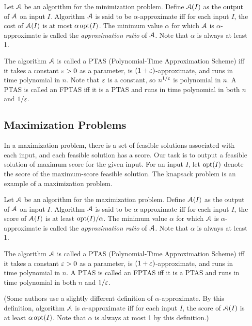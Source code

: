 Let $\mathcal{A}$ be an algorithm for the minimization problem.
Define $\mathcal{A}(I)$ as the output of $\mathcal{A}$ on input $I$.
Algorithm $\mathcal{A}$ is said to be $\alpha$-approximate iff
for each input $I$, the cost of $\mathcal{A}(I)$ is at most $\alpha\operatorname{opt}(I)$.
The minimum value $\alpha$ for which $\mathcal{A}$ is $\alpha$-approximate
is called the \emph{approximation ratio} of $\mathcal{A}$.
Note that $\alpha$ is always at least 1.

The algorithm $\mathcal{A}$ is called a PTAS (Polynomial-Time Approximation Scheme)
iff it takes a constant $\varepsilon > 0$ as a parameter, is $(1+\varepsilon)$-approximate,
and runs in time polynomial in $n$.
Note that $\varepsilon$ is a constant, so $n^{1/\varepsilon}$ is polynomial in $n$.
A PTAS is called an FPTAS iff it is a PTAS and runs in time polynomial
in both $n$ and $1/\varepsilon$.

\subsection{Maximization Problems}
\label{sec:appx:max}

In a maximization problem, there is a set of feasible solutions associated with each input,
and each feasible solution has a score.
Our task is to output a feasible solution of maximum score for the given input.
For an input $I$, let $\operatorname{opt}(I)$ denote the score of the maximum-score feasible solution.
The knapsack problem is an example of a maximization problem.

Let $\mathcal{A}$ be an algorithm for the maximization problem.
Define $\mathcal{A}(I)$ as the output of $\mathcal{A}$ on input $I$.
Algorithm $\mathcal{A}$ is said to be $\alpha$-approximate iff
for each input $I$, the score of $\mathcal{A}(I)$ is at least $\operatorname{opt}(I)/\alpha$.
The minimum value $\alpha$ for which $\mathcal{A}$ is $\alpha$-approximate
is called the \emph{approximation ratio} of $\mathcal{A}$.
Note that $\alpha$ is always at least 1.

The algorithm $\mathcal{A}$ is called a PTAS (Polynomial-Time Approximation Scheme)
iff it takes a constant $\varepsilon > 0$ as a parameter, is $(1+\varepsilon)$-approximate,
and runs in time polynomial in $n$.
A PTAS is called an FPTAS iff it is a PTAS and runs in time polynomial
in both $n$ and $1/\varepsilon$.

(Some authors use a slightly different definition of $\alpha$-approximate.
By this definition, algorithm $\mathcal{A}$ is $\alpha$-approximate iff
for each input $I$, the score of $\mathcal{A}(I)$ is at least $\alpha\operatorname{opt}(I)$.
Note that $\alpha$ is always at most 1 by this definition.)

